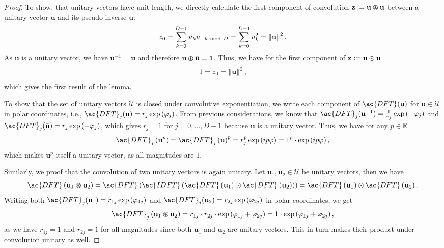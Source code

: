 \begin{proof}
	To show, that unitary vectors have unit length, we directly calculate the first component of convolution $ \mathbf{z} := \mathbf{u} \varoast \bar{ \mathbf{u}}$ between a unitary vector $ \mathbf{u}$ and its pseudo-inverse $\bar{ \mathbf{u}}$:
	\[
	z_{0} = \sum_{k=0}^{D-1} u_{k} \bar{u}_{-k \ \mathrm{mod}\ D} = \sum_{k=0}^{D-1} u_{k}^{2} = \left\|  \mathbf{u} \right\|^{2}.
	\]
	As $ \mathbf{u}$ is a unitary vector, we have $ \mathbf{u}^{-1} = \bar{ \mathbf{u}}$ and therefore $ \mathbf{u}\varoast \bar{ \mathbf{u}} = \mathbf{1}$.
	Thus, we have for the first component of $ \mathbf{z} := \mathbf{u} \varoast \bar{ \mathbf{u}}$
	\[
	1 = z_{0} = \left\|  \mathbf{u} \right\|^{2},
	\]
	which gives the first result of the lemma.
    
	To show that the set of unitary vectors $\mathcal{U}$ is closed under convolutive exponentiation, we write each component of $\ac{DFT}( \mathbf{u})$ for $ \mathbf{u} \in \mathcal{U}$ in polar coordinates, i.e., $\ac{DFT}_j( \mathbf{u}) = r_j\exp\left(\varphi_j\right)$.
	From previous considerations, we know that $\ac{DFT}_j( \mathbf{u}^{-1}) = \frac{1}{r_j}\exp\left(-\varphi_j\right)$ and $\ac{DFT}_j(\bar{ \mathbf{u}}) = r_j\exp\left(-\varphi_j\right)$, which gives $r_j=1$ for $j=0, \ldots, D-1$ because $ \mathbf{u}$ is a unitary vector.
	Thus, we have for any $p \in \mathbb{R}$
	\[
	\ac{DFT}_j\left( \mathbf{u}^{p}\right) = \ac{DFT}_j\left( \mathbf{u}\right)^{p} = r_j^{p}\exp\left(ip\varphi\right) = 1^{p} \cdot \exp\left(ip\varphi\right),
	\]
	which makes $ \mathbf{u}^{p}$ itself a unitary vector, as all magnitudes are $1$.	

    Similarly, we proof that the convolution of two unitary vectors is again unitary. 
    Let $ \mathbf{u}_{1}, \mathbf{u}_{2} \in \mathcal{U}$ be unitary vectors, then we have
    \[
        \ac{DFT} \left( \mathbf{u}_1 \varoast \mathbf{u}_2\right) = \ac{DFT} \left( \ac{IDFT} \left( \ac{DFT} \left( \mathbf{u}_1\right) \odot \ac{DFT} \left( \mathbf{u}_2\right)\right)\right) =  \ac{DFT} \left( \mathbf{u}_1\right) \odot \ac{DFT} \left( \mathbf{u}_2\right).
    \]
    Writing both $\ac{DFT}_j( \mathbf{u}_1) = r_{1j}\exp\left(\varphi_{1j}\right)$ and $\ac{DFT}_j( \mathbf{u}_2) = r_{2j}\exp\left(\varphi_{2j}\right)$ in polar coordinates, we get 
    \[
        \ac{DFT}_j \left( \mathbf{u}_1 \varoast \mathbf{u}_2\right) = r_{1j} \cdot r_{2j} \cdot \exp \left(\varphi_{1j} + \varphi_{2j}\right) = 1 \cdot \exp \left(\varphi_{1j} + \varphi_{2j}\right),
    \]
    as we have $r_{1j}=1$ and $r_{2j}=1$ for all magnitudes since both $ \mathbf{u}_1$ and $ \mathbf{u}_2$ are unitary vectors.
    This in turn makes their product under convolution unitary as well.
    

\end{proof}
